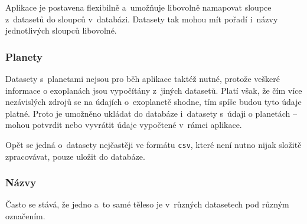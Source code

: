 \documentclass[a4paper,12pt]{article}
\def\code#1{\texttt{#1}}
\begin{document}
{{{{{{{{Aplikace je postavena flexibilně a~umožňuje libovolně namapovat sloupce z~datasetů do sloupců v~databázi. Datasety tak mohou mít pořadí i~názvy jednotlivých sloupců libovolné.


\subsubsection{Planety}

Datasety s~planetami nejsou pro běh aplikace taktéž nutné, protože veškeré informace o exoplanách jsou vypočítány z~jiných datasetů. Platí však, že čím více nezávislých zdrojů se na údajích o~exoplanetě shodne, tím spíše budou tyto údaje platné. Proto je umožněno ukládat do databáze i~datasety s~údaji o planetách -- mohou potvrdit nebo vyvrátit údaje vypočtené v~rámci aplikace.


Opět se jedná o~datasety nejčastěji ve formátu \code{csv}, které není nutno nijak složitě zpracovávat, pouze uložit do databáze.


\subsubsection{Názvy}

Často se stává, že jedno a~to samé těleso je v~různých datasetech pod různým označením.

}}}}}}}}
\end{document}
